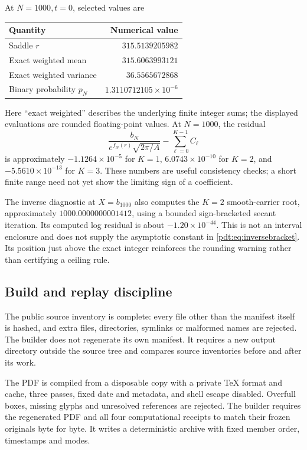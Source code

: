 At $N=1000,t=0$, selected values are
\begin{center}
\begin{tabular}{@{}lr@{}}
\toprule
Quantity & Numerical value\\
\midrule
Saddle $r$ & $315.5139205982$\\
Exact weighted mean & $315.6063993121$\\
Exact weighted variance & $36.5565672868$\\
Binary probability $p_N$ & $1.3110712105\times10^{-6}$\\
\bottomrule
\end{tabular}
\end{center}
Here ``exact weighted'' describes the underlying finite integer sums; the displayed evaluations are rounded floating-point values. At $N=1000$, the residual
\[
 \frac{b_N}{e^{f_N(r)}\sqrt{2\pi/A}}-\sum_{\ell=0}^{K-1}C_\ell
\]
is approximately $-1.1264\times10^{-5}$ for $K=1$, $6.0743\times10^{-10}$ for $K=2$, and $-5.5610\times10^{-13}$ for $K=3$. These numbers are useful consistency checks; a short finite range need not yet show the limiting sign of a coefficient.

The inverse diagnostic at $X=b_{1000}$ also computes the $K=2$ smooth-carrier root, approximately $1000.0000000001412$, using a bounded sign-bracketed secant iteration. Its computed log residual is about $-1.20\times10^{-44}$. This is not an interval enclosure and does not supply the asymptotic constant in \eqref{pdt:eq:inversebracket}. Its position just above the exact integer reinforces the rounding warning rather than certifying a ceiling rule.

\subsection{Build and replay discipline}
The public source inventory is complete: every file other than the manifest itself is hashed, and extra files, directories, symlinks or malformed names are rejected. The builder does not regenerate its own manifest. It requires a new output directory outside the source tree and compares source inventories before and after its work.

The PDF is compiled from a disposable copy with a private TeX format and cache, three passes, fixed date and metadata, and shell escape disabled. Overfull boxes, missing glyphs and unresolved references are rejected. The builder requires the regenerated PDF and all four computational receipts to match their frozen originals byte for byte. It writes a deterministic archive with fixed member order, timestamps and modes.

